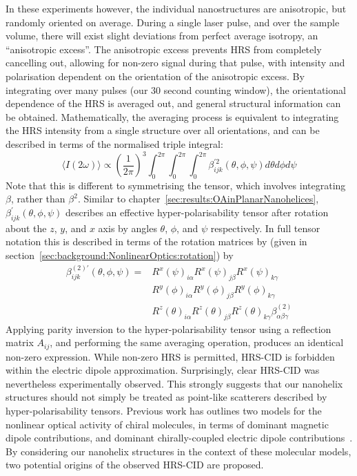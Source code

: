 In these experiments however, the individual nanostructures are anisotropic, but randomly oriented on average. During a single laser pulse, and over the sample volume, there will exist slight deviations from perfect average isotropy, an ``anisotropic excess''. The anisotropic excess prevents HRS from completely cancelling out, allowing for non-zero signal during that pulse, with intensity and polarisation dependent on the orientation of the anisotropic excess. By integrating over many pulses (our 30 second counting window), the orientational dependence of the HRS is averaged out, and general structural information can be obtained.
Mathematically, the averaging process is equivalent to integrating the HRS intensity from a single structure over all orientations, and can be described in terms of the normalised triple integral:
\begin{equation}
    \langle I(2\omega) \rangle \propto
    \left(\frac{1}{2\pi}\right)^3
    \int_{0}^{2\pi} \int_{0}^{2\pi} \int_{0}^{2\pi}
    \beta_{ijk} ^{\prime 2} (\theta, \phi, \psi)
    d\theta d\phi d\psi
\end{equation}
Note that this is different to symmetrising the tensor, which involves integrating $\beta$, rather than $\beta^{2}$. Similar to chapter~\ref{sec:results:OAinPlanarNanohelices}, $\beta_{ijk}^{\prime} (\theta, \phi, \psi)$ describes an effective hyper-polarisability tensor after rotation about the $z$, $y$, and $x$ axis by angles $\theta$, $\phi$, and $\psi$ respectively. In full tensor notation this is described in terms of the rotation matrices by (given in section~\ref{sec:background:NonlinearOptics:rotation}) by
\begin{equation}
    \begin{split}
        \beta_{ijk}^{(2) \prime} (\theta, \phi, \psi) =
        & R^{x}(\psi)_{i\alpha}R^{x}(\psi)_{j\beta}R^{x}(\psi)_{k\gamma} \\
        & R^{y}(\phi)_{i\alpha}R^{y}(\phi)_{j\beta}R^{y}(\phi)_{k\gamma} \\
        & R^{z}(\theta)_{i\alpha}R^{z}(\theta)_{j\beta}R^{z}(\theta)_{k\gamma}
        \beta_{\alpha \beta \gamma}^{(2)}
    \end{split}
\end{equation}
Applying parity inversion to the hyper-polarisability tensor using a reflection matrix $A_{ij}$, and performing the same averaging operation, produces an identical non-zero expression. While non-zero HRS is permitted, HRS-CID is forbidden within the electric dipole approximation. Surprisingly, clear HRS-CID was nevertheless experimentally observed. This strongly suggests that our nanohelix structures should not simply be treated as point-like scatterers described by hyper-polarisability tensors. Previous work has outlines two models for the nonlinear optical activity of chiral molecules, in terms of dominant magnetic dipole contributions, and dominant chirally-coupled electric dipole contributions~\cite{Fischer2005a}. By considering our nanohelix structures in the context of these molecular models, two potential origins of the observed HRS-CID are proposed.

